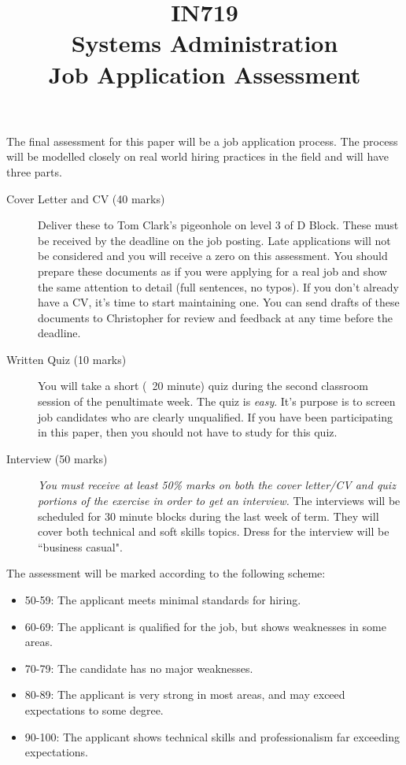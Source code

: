 \documentclass{article}   	%
\title{IN719\\Systems Administration\\Job Application Assessment}
\date{}
\begin{document}
\maketitle
The final assessment for this paper will be a job application process.  The process will be modelled closely on real world hiring practices in the field and will have three parts.


\begin{description}
\item[Cover Letter and CV (40 marks)] Deliver these to Tom Clark's pigeonhole on level 3 of D Block.  These must be received by the deadline on the job posting.  Late applications will not be considered and you will receive a zero on this assessment.  You should prepare these documents as if you were applying for a real job and show the same attention to detail (full sentences, no typos).  If you don't already have a CV, it's time to start maintaining one.  You can send drafts of these documents to Christopher for review and feedback at any time before the deadline.

\item[Written Quiz (10 marks)] You will take a short (~20 minute) quiz during the second classroom session of the penultimate week.  The quiz is \emph{easy}.  It's purpose is to screen job candidates who are clearly unqualified.  If you have been participating in this paper, then you should not have to study for this quiz.

\item[Interview (50 marks)] \emph{You must receive at least 50\% marks on both the cover letter/CV and quiz portions of the exercise in order to get an interview.} The interviews will be scheduled for 30 minute blocks during the last week of term.  They will cover both technical and soft skills topics.  Dress for the interview will be ``business casual".  

\end{description}

The assessment will be marked according to the following scheme:
\begin{itemize}
\item 50-59:  The applicant meets minimal standards for hiring.  
\item 60-69:  The applicant is qualified for the job, but shows weaknesses in some areas.
\item 70-79:  The candidate has no major weaknesses. 
\item 80-89:  The applicant is very strong in most areas, and may exceed expectations to some degree. 
\item 90-100: The applicant shows technical skills and professionalism far exceeding expectations.  
\end{itemize}
\end{document}
